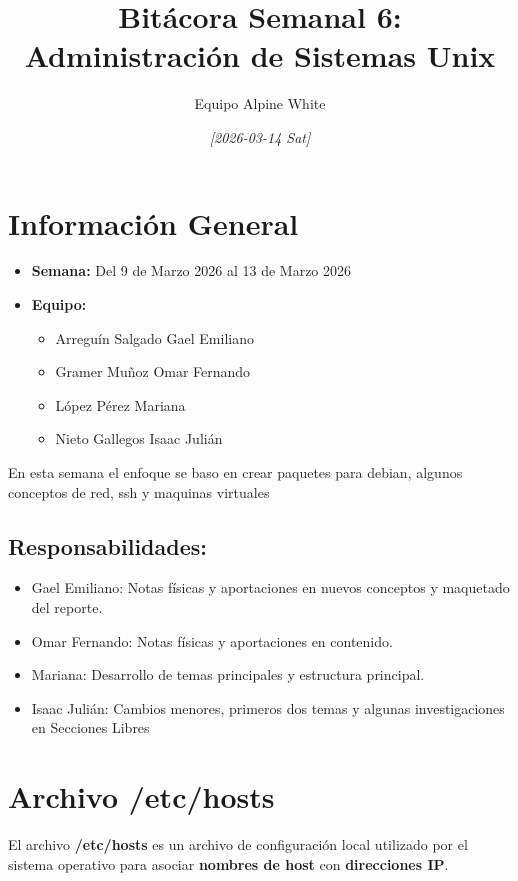 \documentclass[11pt, letterpaper]{article}
\author{Equipo Alpine White}
\date{\textit{{[}2026-03-14 Sat]}}
\title{Bitácora Semanal 6: Administración de Sistemas Unix}
\begin{document}
\maketitle
\setcounter{tocdepth}{2}
\tableofcontents

\section{Información General}
\label{sec:orga430dcd}
\begin{itemize}
\item \textbf{Semana:} Del 9 de Marzo 2026 al 13 de Marzo 2026
\item \textbf{Equipo:}
\begin{itemize}
\item Arreguín Salgado Gael Emiliano
\item Gramer Muñoz Omar Fernando
\item López Pérez Mariana
\item Nieto Gallegos Isaac Julián
\end{itemize}
\end{itemize}

En esta semana el enfoque se baso en crear paquetes para debian, algunos conceptos de red, ssh y maquinas virtuales
\subsection{Responsabilidades:}
\label{sec:orgf4205cb}

\begin{itemize}
\item Gael Emiliano: Notas físicas y aportaciones en nuevos conceptos y maquetado del reporte.
\item Omar Fernando: Notas físicas y aportaciones en contenido.
\item Mariana: Desarrollo de temas principales y estructura principal.
\item Isaac Julián: Cambios menores, primeros dos temas y algunas investigaciones en Secciones Libres
\end{itemize}
\section{Archivo /etc/hosts}
\label{sec:org39dbf4d}

El archivo \textbf{/etc/hosts} es un archivo de configuración local utilizado por el sistema
operativo para asociar \textbf{nombres de host} con \textbf{direcciones IP}.
\end{document}
